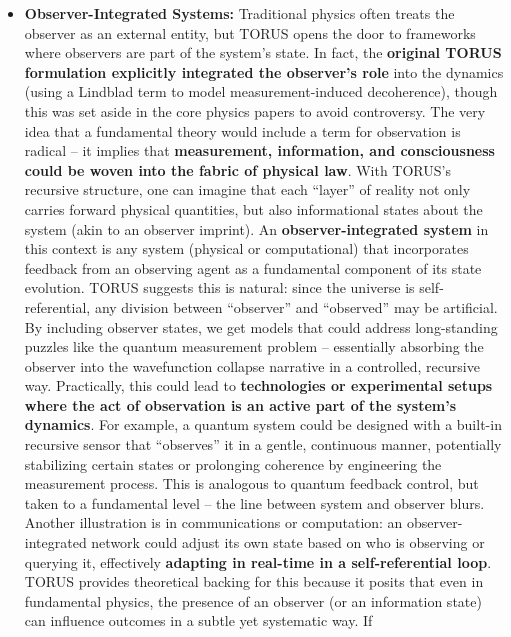 \documentclass[
]{article}
\begin{document}
{\begin{itemize}
\item
  \textbf{Observer-Integrated Systems:} Traditional physics often treats
  the observer as an external entity, but TORUS opens the door to
  frameworks where observers are part of the system's state. In fact,
  the \textbf{original TORUS formulation explicitly integrated the
  observer's role} into the dynamics (using a Lindblad term to model
  measurement-induced decoherence), though this was set aside in the
  core physics papers to avoid controversy\hspace{0pt}. The very idea
  that a fundamental theory would include a term for observation is
  radical -- it implies that \textbf{measurement, information, and
  consciousness could be woven into the fabric of physical law}. With
  TORUS's recursive structure, one can imagine that each ``layer'' of
  reality not only carries forward physical quantities, but also
  informational states about the system (akin to an observer imprint).
  An \textbf{observer-integrated system} in this context is any system
  (physical or computational) that incorporates feedback from an
  observing agent as a fundamental component of its state evolution.
  TORUS suggests this is natural: since the universe is
  self-referential, any division between ``observer'' and ``observed''
  may be artificial. By including observer states, we get models that
  could address long-standing puzzles like the quantum measurement
  problem -- essentially absorbing the observer into the wavefunction
  collapse narrative in a controlled, recursive way\hspace{0pt}.
  Practically, this could lead to \textbf{technologies or experimental
  setups where the act of observation is an active part of the system's
  dynamics}. For example, a quantum system could be designed with a
  built-in recursive sensor that ``observes'' it in a gentle, continuous
  manner, potentially stabilizing certain states or prolonging coherence
  by engineering the measurement process. This is analogous to quantum
  feedback control, but taken to a fundamental level -- the line between
  system and observer blurs. Another illustration is in communications
  or computation: an observer-integrated network could adjust its own
  state based on who is observing or querying it, effectively
  \textbf{adapting in real-time in a self-referential loop}. TORUS
  provides theoretical backing for this because it posits that even in
  fundamental physics, the presence of an observer (or an information
  state) can influence outcomes in a subtle yet systematic way. If

\end{itemize}}
\end{document}
